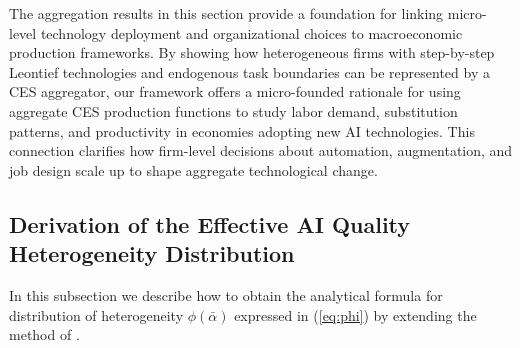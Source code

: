 The aggregation results in this section provide a foundation for linking micro-level technology deployment and organizational choices to macroeconomic production frameworks.
By showing how heterogeneous firms with step-by-step Leontief technologies and endogenous task boundaries can be represented by a CES aggregator, our framework offers a micro-founded rationale for using aggregate CES production functions to study labor demand, substitution patterns, and productivity in economies adopting new AI technologies.
This connection clarifies how firm-level decisions about automation, augmentation, and job design scale up to shape aggregate technological change.



\subsection{Derivation of the Effective AI Quality Heterogeneity Distribution}
\label{sec:aggregationDist}

In this subsection we describe how to obtain the analytical formula for distribution of heterogeneity $\phi(\bar{\alpha})$ expressed in (\ref{eq:phi}) by extending the method of \cite{levhari1968note}.


